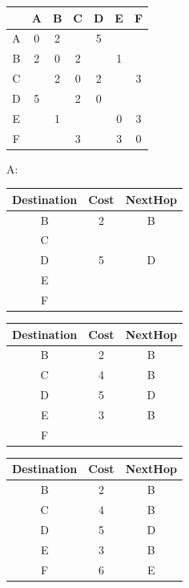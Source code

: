 \documentclass[12pt]{article}
\begin{document}
\begin{center}
	\begin{tabular}{|c||c|c|c|c|c|c|}
		\hline
		  & A & B & C & D & E & F \\\hline
		\hline
		A & 0 & 2 &   & 5 &   &   \\\hline
		B & 2 & 0 & 2 &   & 1 &   \\\hline
		C &   & 2 & 0 & 2 &   & 3 \\\hline
		D & 5 &   & 2 & 0 &   &   \\\hline
		E &   & 1 &   &   & 0 & 3 \\\hline
		F &   &   & 3 &   & 3 & 0 \\\hline
	\end{tabular}
\end{center}
A:\\
\begin{tabular}{|c|c|c|}
	\hline
	Destination & Cost & NextHop \\\hline
	\hline
	B           & 2    & B       \\\hline
	C           &      &         \\\hline
	D           & 5    & D       \\\hline
	E           &      &         \\\hline
	F           &      &         \\\hline
\end{tabular}
\begin{tabular}{|c|c|c|}
	\hline
	Destination & Cost & NextHop \\\hline
	\hline
	B           & 2    & B       \\\hline
	C           & 4    & B       \\\hline
	D           & 5    & D       \\\hline
	E           & 3    & B       \\\hline
	F           &      &         \\\hline
\end{tabular}
\begin{tabular}{|c|c|c|}
	\hline
	Destination & Cost & NextHop \\\hline
	\hline
	B           & 2    & B       \\\hline
	C           & 4    & B       \\\hline
	D           & 5    & D       \\\hline
	E           & 3    & B       \\\hline
	F           & 6    & E       \\\hline
\end{tabular}
\end{document}
